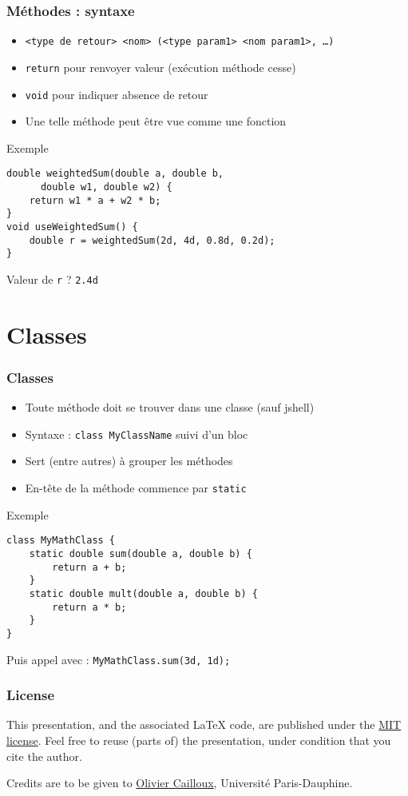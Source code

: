 \documentclass[english, french]{beamer}
\begin{document}
\begin{frame}[fragile]
	\frametitle{Méthodes : syntaxe}
	\begin{itemize}
		\item \texttt{<type de retour> <nom> (<type param1> <nom param1>, …)}
		\item \texttt{return} pour renvoyer valeur (exécution méthode cesse)
		\item \texttt{void} pour indiquer absence de retour
		\item Une telle méthode peut être vue comme une fonction
	\end{itemize}
	\begin{block}{Exemple}
		\begin{lstlisting}
double weightedSum(double a, double b, 
      double w1, double w2) {
	return w1 * a + w2 * b;
}
void useWeightedSum() {
	double r = weightedSum(2d, 4d, 0.8d, 0.2d);
}
		\end{lstlisting}	
	\end{block}
	Valeur de \texttt{r} ? \pause \texttt{2.4d}
\end{frame}

\section{Classes}
\begin{frame}[fragile]
	\frametitle{Classes}
	\begin{itemize}
		\item Toute méthode doit se trouver dans une classe (sauf jshell)
		\item Syntaxe : \texttt{class MyClassName} suivi d’un bloc
		\item Sert (entre autres) à grouper les méthodes
		\item En-tête de la méthode commence par \texttt{static}
	\end{itemize}
	\begin{block}{Exemple}
		\begin{lstlisting}
class MyMathClass {
	static double sum(double a, double b) {
		return a + b;
	}
	static double mult(double a, double b) {
		return a * b;
	}
}
		\end{lstlisting}	
	\end{block}
	Puis appel avec : \texttt{MyMathClass.sum(3d, 1d);}
\end{frame}

\appendix
\makeatletter
\def\insertframenumber{\@roman\c@framenumber}
\def\inserttotalframenumber{\@roman\c@framenumber}
\makeatother
\AtBeginSection{
}

\clearpage{}
\begin{frame}[plain]
	\frametitle{License}
	This presentation, and the associated \LaTeX{} code, are published under the \href{https://opensource.org/licenses/MIT}{MIT license}. Feel free to reuse (parts of) the presentation, under condition that you cite the author.
	
	Credits are to be given to \href{http://www.lamsade.dauphine.fr/~ocailloux/}{Olivier Cailloux}, Université Paris-Dauphine.
\end{frame}
\addtocounter{framenumber}{-1}
\end{document}
